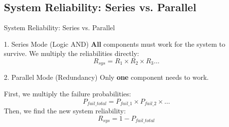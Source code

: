 \subsection{System Reliability: Series vs. Parallel}
\begin{frame}{System Reliability: Series vs. Parallel}
    
    \begin{block}{1. Series Mode (Logic AND)}
        \textbf{All} components must work for the system to survive. We multiply the reliabilities directly:
        $$R_{sys} = R_1 \times R_2 \times R_3 \dots$$
    \end{block}
    
    \begin{block}{2. Parallel Mode (Redundancy)}
        Only \textbf{one} component needs to work. 
        
        First, we multiply the failure probabilities:
        $$P_{fail\_total} = P_{fail\_1} \times P_{fail\_2} \times \dots$$
        Then, we find the new system reliability:
        $$R_{sys} = 1 - P_{fail\_total}$$
    \end{block}
\end{frame}

